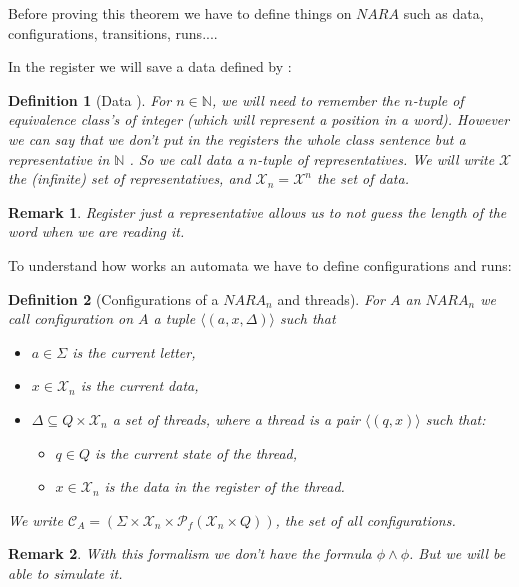 \documentclass[a4paper,10pt]{report}
\newtheorem{df}{Definition}
\newtheorem{rk}{Remark}
\newcommand{\C}{\mathcal{C}_{A}}
\newcommand{\Xa}{\mathcal{X}}
\newcommand{\X}{\mathcal{X}_{n}}
\begin{document}
Before proving this theorem we have to define things on $NARA$ such as data, configurations, transitions, runs....


In the register we will save a data defined by :  
\begin{df}[Data ]
  For $n\in \mathbb N$, we will need to remember the $n$-tuple of equivalence class's of integer (which will represent a position in a word).
  However we can say that we don't put in the registers the whole class sentence but a representative in $\mathbb N$ .
  So we call data a $n$-tuple of representatives.
  We will write $\Xa$ the (infinite) set of representatives, and $\X = \Xa^n$ the set of data.
\end{df}

\begin{rk}
 Register just a representative allows us to not guess the length of the word when we are reading it.
\end{rk}

To understand how works an automata we have to define configurations and runs: 

\begin{df}[Configurations of a $NARA_n$ and threads]
For $A$ an $NARA_n$ we call configuration on $A$ a tuple  
 $\langle  (a ,x, \Delta  )  \rangle$
 such that 
  \begin{itemize}
    \item $a \in \Sigma$ is the current letter, 
    \item $x\in  \X$ is the current data, 
    \item $\Delta \subseteq Q \times \X$ a set of threads, where a thread is a pair  
    $\langle (q,x)  \rangle$ such that:
      \begin{itemize}
	\item $q \in Q$ is the current state of the thread,
	\item $x\in  \X $ is the data in the register of the thread.
      \end{itemize}
   \end{itemize}
 We write $\C = ( \Sigma \times \X \times \mathcal{P}_f(\X \times Q))$, the set of all configurations.
\end{df}

\begin{rk}
  With this formalism we don't have the formula $ \phi \wedge \phi$. But we will be able to simulate it.
\end{rk}
\end{document}
